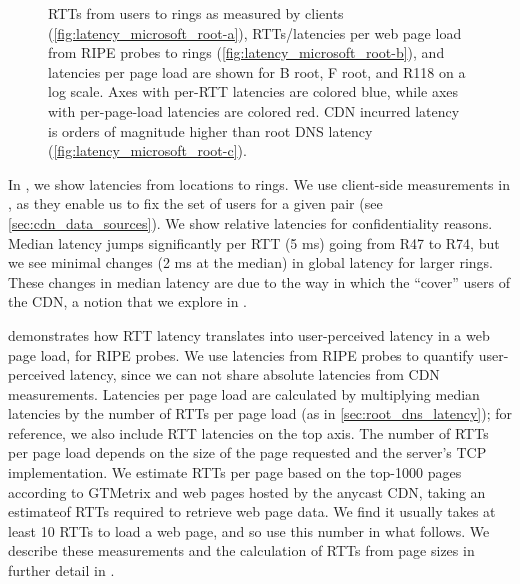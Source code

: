 \documentclass[sigconf,letterpaper,nonacm,10pt,anonymous]{acmart}
\begin{document}
\begin{figure*}
  \centering

  \caption{RTTs from users to rings as measured by clients (\ref{fig:latency_microsoft_root-a}), RTTs/latencies per web page load from RIPE probes to rings (\ref{fig:latency_microsoft_root-b}), and latencies per page load are shown for B root, F root, and R118 on a log scale. Axes with per-RTT latencies are colored blue, while axes with per-page-load latencies are colored red. CDN incurred latency is orders of magnitude higher than root DNS latency (\ref{fig:latency_microsoft_root-c}).}


    \label{fig:latency_microsoft_root}
\end{figure*}

In , we show latencies from
\metroas locations to rings. We use client-side measurements in
, as they enable us to fix the set of
users for a given \metroas pair (see \cref{sec:cdn_data_sources}). We
show relative latencies for confidentiality reasons. Median latency
jumps significantly per RTT (5 ms) going from R47 to R74, but we see
minimal changes (2 ms at the median) in global latency for larger rings.
These changes in median latency are due to the way in which the
\feplural ``cover'' users of the CDN, a notion that we explore in
.

 demonstrates how RTT latency
translates into user-perceived latency in a web page load, for RIPE
probes. We use latencies from RIPE probes to quantify user-perceived
latency, since we can not share absolute latencies from CDN
measurements. Latencies per page load are calculated by multiplying
median latencies by the number of RTTs per page load (as in
\cref{sec:root_dns_latency}); for reference, we also include RTT
latencies on the top axis. The number of RTTs per page load depends on
the size of the page requested and the server's TCP implementation. We
estimate RTTs per page based on the top-1000 pages according to GTMetrix
\cite{gtmetrix} and web pages hosted by the anycast CDN, taking an
estimateof RTTs required to retrieve web page data. We find it usually
takes at least 10 RTTs to load a web page, and so use this number in
what follows. We describe these measurements and the calculation of RTTs
from page sizes in further detail in .
\end{document}
